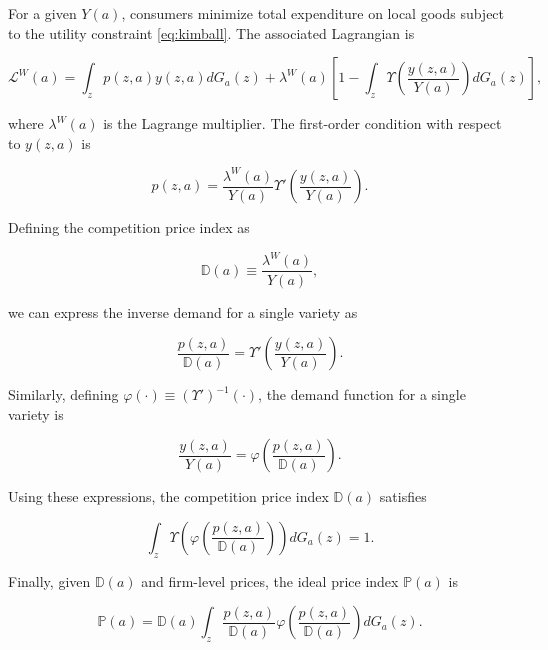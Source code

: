 For a given $Y(a)$, consumers minimize total expenditure on local goods subject to the utility constraint \eqref{eq:kimball}. The associated Lagrangian is  

\begin{equation*}
	\mathcal{L}^W(a) =  \int_{z} p(z,a) y(z,a) dG_a(z) + \lambda^W(a) \left[1 -  \int_{z} \Upsilon\left(\frac{y(z,a)}{Y(a)}\right) dG_a(z) \right],
\end{equation*}

where $\lambda^W(a)$ is the Lagrange multiplier. The first-order condition with respect to $y(z,a)$ is  

\begin{equation*}
	p(z,a) = \frac{\lambda^W(a)}{Y(a)} \Upsilon'\left(\frac{y(z,a)}{Y(a)}\right).
\end{equation*}

Defining the competition price index as  

\begin{equation*}
	\mathbb{D}(a) \equiv \frac{\lambda^W(a)}{Y(a)},
\end{equation*}

we can express the inverse demand for a single variety as  

\begin{equation*}
	\frac{p(z,a)}{\mathbb{D}(a)} = \Upsilon'\left(\frac{y(z,a)}{Y(a)}\right).
\end{equation*}

Similarly, defining $\varphi(\cdot) \equiv \left(\Upsilon'\right)^{-1}(\cdot)$, the demand function for a single variety is  

\begin{equation*}
	\frac{y(z,a)}{Y(a)} = \varphi\left(\frac{p(z,a)}{\mathbb{D}(a)}\right).
\end{equation*}

Using these expressions, the competition price index $\mathbb{D}(a)$ satisfies  

\begin{equation*}
	\int_{z} \Upsilon\left(\varphi\left(\frac{p(z,a)}{\mathbb{D}(a)}\right)\right) dG_a(z) = 1.
\end{equation*}

Finally, given $\mathbb{D}(a)$ and firm-level prices, the ideal price index $\mathbb{P}(a)$ is  

\begin{equation}\label{eq:pdratio}
	\mathbb{P}(a) = \mathbb{D}(a) \int_{z} \frac{p(z,a)}{\mathbb{D}(a)}  \varphi\left(\frac{p(z,a)}{\mathbb{D}(a)}\right) dG_a(z).
\end{equation}


